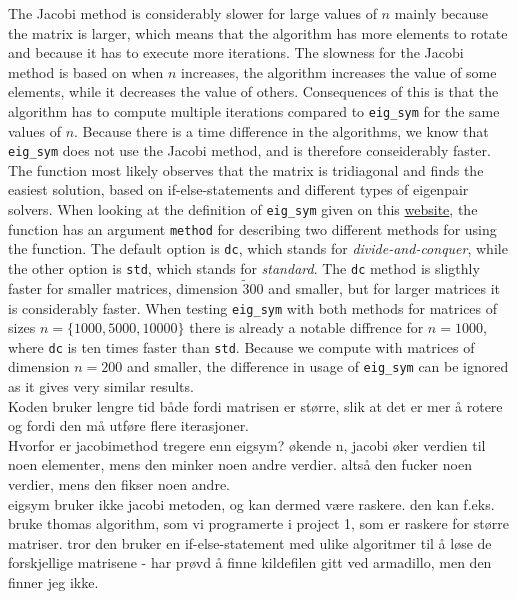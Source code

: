 \documentclass{article}
\begin{document}
  The Jacobi method is considerably slower for large values of $n$ mainly because the matrix is larger, which means that the algorithm has more elements to rotate and because it has to execute more iterations. The slowness for the Jacobi method is based on when $n$ increases, the algorithm increases the value of some elements, while it decreases the value of others. Consequences of this is that the algorithm has to compute multiple iterations compared to \texttt{eig\_sym} for the same values of $n$.
  Because there is a time difference in the algorithms, we know that \texttt{eig\_sym} does not use the Jacobi method, and is therefore conseiderably faster. The function most likely observes that the matrix is tridiagonal and finds the easiest solution, based on if-else-statements and different types of eigenpair solvers. When looking at the definition of \texttt{eig\_sym} given on this \href{http://arma.sourceforge.net/docs.html#eig_sym}{website}, the function has an argument \texttt{method} for describing two different methods for using the function. The default option is \texttt{dc}, which stands for \textit{divide-and-conquer}, while the other option is \texttt{std}, which stands for \textit{standard}. The \texttt{dc} method is sligthly faster for smaller matrices, dimension $\tilde 300$ and smaller, but for larger matrices it is considerably faster.
  When testing \texttt{eig\_sym} with both methods for matrices of sizes $n = \{ 1000, 5000, 10000\}$ there is already a notable diffrence for $n = 1000$, where \texttt{dc} is ten times faster than \texttt{std}. Because we compute with matrices of dimension $n = 200$ and smaller, the difference in usage of \texttt{eig\_sym} can be ignored as it gives very similar results. \\


    Koden bruker lengre tid både fordi matrisen er større, slik at det er mer å rotere og fordi den må
    utføre flere iterasjoner. \\

    Hvorfor er jacobimethod tregere enn eigsym? økende n, jacobi øker verdien til noen elementer, mens den minker noen andre verdier. altså den fucker noen verdier, mens den fikser noen andre. \\

    eigsym bruker ikke jacobi metoden, og kan dermed være raskere. den kan f.eks. bruke thomas algorithm, som vi programerte i project 1, som er raskere for større matriser. tror den bruker en if-else-statement med ulike algoritmer til å løse de forskjellige matrisene - har prøvd å finne kildefilen gitt ved armadillo, men den finner jeg ikke. \\
\end{document}

